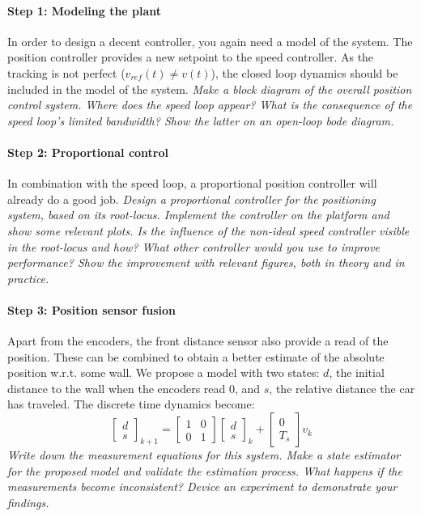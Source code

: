 \documentclass[10pt,a4paper]{article}
\begin{document}
\paragraph{Step 1: Modeling the plant} In order to design a decent controller, you again need a model of the system. The position controller provides a new setpoint to the speed controller. As the tracking is not perfect ($v_{ref}\left(t\right) \neq v\left(t\right)$), the closed loop dynamics should be included in the model of the system. \textit{Make a block diagram of the overall position control system. Where does the speed loop appear? What is the consequence of the speed loop's limited bandwidth? Show the latter on an open-loop bode diagram.}
\paragraph{Step 2: Proportional control} In combination with the speed loop, a proportional position controller will already do a good job. \textit{Design a proportional controller for the positioning system, based on its root-locus. Implement the controller on the platform and show some relevant plots. Is the influence of the non-ideal speed controller visible in the root-locus and how? What other controller would you use to improve performance? Show the improvement with relevant figures, both in theory and in practice.}
\paragraph{Step 3: Position sensor fusion} Apart from the encoders, the front distance sensor also provide a read of the position. These can be combined to obtain a better estimate of the absolute position w.r.t. some wall. We propose a model with two states: $d$, the initial distance to the wall when the encoders read 0, and $s$, the relative distance the car has traveled. The discrete time dynamics become:
\begin{equation}
\begin{bmatrix} d\\s \end{bmatrix}_{k+1} = \begin{bmatrix}1&0\\0&1\end{bmatrix}\begin{bmatrix} d\\s \end{bmatrix}_{k} + \begin{bmatrix}0\\T_s\end{bmatrix}v_k
\end{equation}
\textit{Write down the measurement equations for this system. Make a state estimator for the proposed model and validate the estimation process. What happens if the measurements become inconsistent? Device an experiment to demonstrate your findings.}
\end{document}
